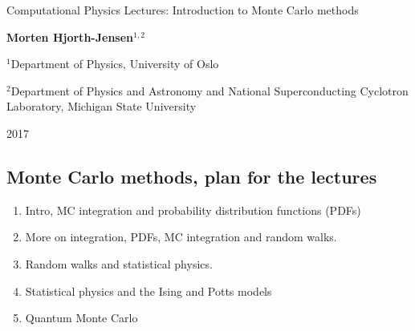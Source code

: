 \documentclass[%
oneside,                 %
final,                   %
10pt]{article}
\newenvironment{block_mdfboxadmon}[1][]{
\begin{block_mdfboxmdframed}[frametitle=#1]
}
{
\end{block_mdfboxmdframed}
}
\begin{document}

\newcommand{\exercisesection}[1]{\subsection*{#1}}






\thispagestyle{empty}

\begin{center}
{\LARGE\bf
\begin{spacing}{1.25}
Computational Physics Lectures: Introduction to Monte Carlo methods
\end{spacing}
}
\end{center}


\begin{center}
{\bf Morten Hjorth-Jensen${}^{1, 2}$} \\ [0mm]
\end{center}

\begin{center}
\centerline{{\small ${}^1$Department of Physics, University of Oslo}}
\centerline{{\small ${}^2$Department of Physics and Astronomy and National Superconducting Cyclotron Laboratory, Michigan State University}}
\end{center}
    

\begin{center}
2017
\end{center}

\vspace{1cm}


\subsection{Monte Carlo methods, plan for the lectures}

\begin{block_mdfboxadmon}[]
\begin{enumerate}
\item Intro, MC integration and probability distribution functions (PDFs)

\item More on integration, PDFs, MC integration and random walks.

\item Random walks and statistical physics.

\item Statistical physics and the Ising and Potts models

\item Quantum Monte Carlo
\end{enumerate}

\noindent
\end{block_mdfboxadmon} %
\end{document}
